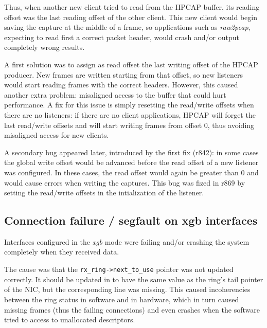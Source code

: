 Thus, when another new client tried to read from the HPCAP buffer, its reading offset was the last reading offset of the other client. This new client would begin saving the capture at the middle of a frame, so applications such as \textit{raw2pcap}, expecting to read first a correct packet header, would crash and/or output completely wrong results.

A first solution was to assign as read offset the last writing offset of the HPCAP producer. New frames are written starting from that offset, so new listeners would start reading frames with the correct headers. However, this caused another extra problem: misaligned access to the buffer that could hurt performance. A fix for this issue is simply resetting the read/write offsets when there are no listeners: if there are no client applications, HPCAP will forget the last read/write offsets and will start writing frames from offset 0, thus avoiding misaligned access for new clients.

A secondary bug appeared later, introduced by the first fix (r842): in some cases the global write offset would be advanced before the read offset of a new listener was configured. In these cases, the read offset would again be greater than 0 and would cause errors when writing the captures. This bug was fized in r869 by setting the read/write offsets in the intialization of the listener.

\subsection{Connection failure / segfault on xgb interfaces}

\begin{bugdata}
\end{bugdata}

Interfaces configured in the \textit{xgb} mode were failing and/or crashing the system completely when they received data.

The cause was that the \texttt{rx\_ring->next\_to\_use} pointer was not updated correctly. It should be updated in  to have the same value as the ring's tail pointer of the NIC, but the corresponding line was missing. This caused incoherencies between the ring status in software and in hardware, which in turn caused missing frames (thus the failing connections) and even crashes when the software tried to access to unallocated descriptors.

